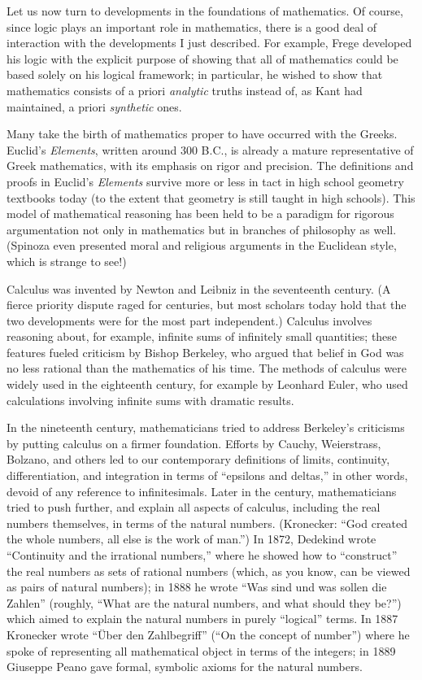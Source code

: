 \documentclass[../../../include/open-logic-section]{subfiles}
\begin{document}
Let us now turn to developments in the foundations of mathematics. Of
course, since logic plays an important role in mathematics, there is a
good deal of interaction with the developments I just described. For
example, Frege developed his logic with the explicit purpose of
showing that all of mathematics could be based solely on his logical
framework; in particular, he wished to show that mathematics consists
of a priori \emph{analytic} truths instead of, as Kant had maintained,
a priori \emph{synthetic} ones.

Many take the birth of mathematics proper to have occurred with the
Greeks. Euclid's \emph{Elements}, written around 300 B.C., is already
a mature representative of Greek mathematics, with its emphasis on
rigor and precision. The definitions and proofs in Euclid's
\emph{Elements} survive more or less in tact in high school geometry
textbooks today (to the extent that geometry is still taught in high
schools). This model of mathematical reasoning has been held to be a
paradigm for rigorous argumentation not only in mathematics but in
branches of philosophy as well. (Spinoza even presented moral and
religious arguments in the Euclidean style, which is strange to see!)

Calculus was invented by Newton and Leibniz in the seventeenth
century. (A fierce priority dispute raged for centuries, but most
scholars today hold that the two developments were for the most part
independent.)  Calculus involves reasoning about, for example,
infinite sums of infinitely small quantities; these features fueled
criticism by Bishop Berkeley, who argued that belief in God was no
less rational than the mathematics of his time. The methods of
calculus were widely used in the eighteenth century, for example by
Leonhard Euler, who used calculations involving infinite sums with
dramatic results.

In the nineteenth century, mathematicians tried to address Berkeley's
criticisms by putting calculus on a firmer foundation. Efforts by
Cauchy, Weierstrass, Bolzano, and others led to our contemporary
definitions of limits, continuity, differentiation, and integration in
terms of ``epsilons and deltas,'' in other words, devoid of any
reference to infinitesimals. Later in the century, mathematicians
tried to push further, and explain all aspects of calculus, including
the real numbers themselves, in terms of the natural numbers.
(Kronecker: ``God created the whole numbers, all else is the work of
man.'') In 1872, Dedekind wrote ``Continuity and the irrational
numbers,'' where he showed how to ``construct'' the real numbers as
sets of rational numbers (which, as you know, can be viewed as pairs
of natural numbers); in 1888 he wrote ``Was sind und was sollen die
Zahlen'' (roughly, ``What are the natural numbers, and what should
they be?'') which aimed to explain the natural numbers in purely
``logical'' terms. In 1887 Kronecker wrote ``\"Uber den Zahlbegriff''
(``On the concept of number'') where he spoke of representing all
mathematical object in terms of the integers; in 1889 Giuseppe Peano
gave formal, symbolic axioms for the natural numbers.
\end{document}
